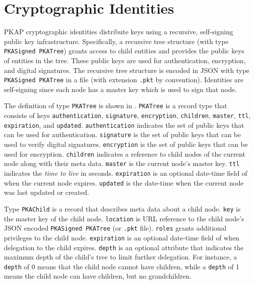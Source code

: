 \documentclass{article}
\newcommand{\pkap}{PKAP}
\begin{document}
\section{Cryptographic Identities}
\label{sec:identities}


\pkap{} cryptographic identities distribute keys using a recursive, self-signing public key infrastructure. 
Specifically, a recursive tree structure (with type \texttt{PKASigned PKATree}) grants access to child entities and provides the public keys of entities in the tree. 
These public keys are used for authentication, encryption, and digital signatures. 
The recursive tree structure is encoded in JSON with type \texttt{PKASigned PKATree} in a file (with extension \texttt{.pkt} by convention). 
Identities are self-signing since each node has a master key which is used to sign that node. 

The definition of type \texttt{PKATree} is shown in . 
\texttt{PKATree} is a record type that consists of keys \texttt{authentication}, \texttt{signature}, \texttt{encryption}, \texttt{children}, \texttt{master}, \texttt{ttl}, \texttt{expiration}, and \texttt{updated}. 
\texttt{authentication} indicates the set of public keys that can be used for authentication. 
\texttt{signature} is the set of public keys that can be used to verify digital signatures. 
\texttt{encryption} is the set of public keys that can be used for encryption. 
\texttt{children} indicates a reference to child nodes of the current node along with their meta data. 
\texttt{master} is the current node's master key. 
\texttt{ttl} indicates the \emph{time to live} in seconds. 
\texttt{expiration} is an optional date-time field of when the current node expires. 
\texttt{updated} is the date-time when the current node was last updated or created. 


Type \texttt{PKAChild} is a record that describes meta data about a child node. 
\texttt{key} is the master key of the child node. 
\texttt{location} is URL reference to the child node's JSON encoded \texttt{PKASigned PKATree} (or \texttt{.pkt} file). 
\texttt{roles} grants additional privileges to the child node. 
\texttt{expiration} is an optional date-time field of when delegation to the child expires. 
\texttt{depth} is an optional attribute that indicates the maximum depth of the child's tree to limit further delegation. 
For instance, a \texttt{depth} of 0 means that the child node cannot have children, while a \texttt{depth} of 1 means the child node can have children, but no grandchildren. 
\end{document}

